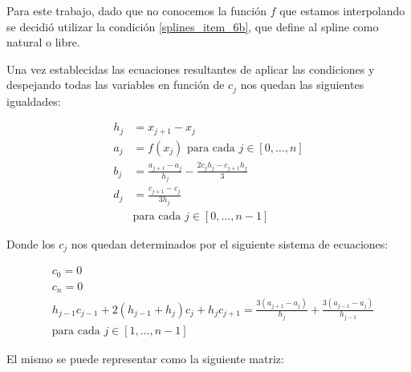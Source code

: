 Para este trabajo, dado que no conocemos la función $f$ que estamos
interpolando se decidió utilizar la condición \ref{splines_item_6b}, que define
al spline como natural o libre.

\cite{Burden}
Una vez establecidas las ecuaciones resultantes de aplicar las condiciones y
despejando todas las variables en función de $c_j$ nos quedan las siguientes
igualdades:

\begin{align*}
	h_j &= x_{j+1} - x_j \\
	a_j &= f(x_j) \text{ para cada } j \in [0, \dots, n] \\
	b_j &= \frac{a_{j+1}-a_j}{h_j} - \frac{2c_jh_j - c_{j+1}h_j}{3} \\
	d_j &= \frac{c_{j+1} - c_j}{3h_j} \\
		&\text{para cada } j \in [0, \dots, n - 1]
\end{align*}

Donde los $c_j$ nos quedan determinados por el siguiente sistema de ecuaciones:

\begin{align*}
	&c_0 = 0 \\
	&c_n = 0 \\
	&h_{j-1}c_{j-1} + 2(h_{j-1} + h_j)c_j + h_jc_{j+1} = \frac{3(a_{j+1} - a_j)}{h_j} + \frac{3(a_{j-1} - a_j)}{h_{j-1}} \\
		&\text{para cada } j \in [1, \dots, n - 1]
\end{align*}

El mismo se puede representar como la siguiente matriz:

\setlength{\arraycolsep}{2pt}

